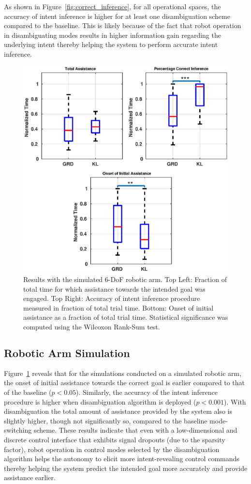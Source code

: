 \documentclass[conference]{IEEEtran}
\begin{document}
As shown in Figure~\ref{fig:correct_inference}, for all operational spaces, the accuracy of intent inference is higher for at least one disambiguation scheme compared to the baseline. This is likely because of the fact that robot operation in disambiguating modes results in higher information gain regarding the underlying intent thereby helping the system to perform accurate intent inference.
\begin{figure}[t]
	\centering
	\includegraphics[width= 1.\hsize, height=0.5\vsize]{./figures/mico_sim_res.eps}
	\vspace{-0.5cm}
	\caption{Results with the simulated 6-DoF robotic arm. Top Left: Fraction of total time for which assistance towards the intended goal was engaged. Top Right: Accuracy of intent inference procedure measured in fraction of total trial time. Bottom: Onset of initial assistance as a fraction of total trial time. Statistical significance was computed using the Wilcoxon Rank-Sum test. } 
	\label{fig:mico_results}
\end{figure}
\subsection{Robotic Arm Simulation}
Figure~\ref{fig:mico_results} reveals that for the simulations conducted on a simulated robotic arm, the onset of initial assistance towards the correct goal is earlier compared to that of the baseline ($p < 0.05$). Similarly, the accuracy of the intent inference procedure is higher when disambiguation algorithm is deployed ($p < 0.001$). With disambiguation the total amount of assistance provided by the system also is slightly higher, though not significantly so, compared to the baseline mode-switching scheme. These results indicate that even with a low-dimensional and discrete control interface that exhibits signal dropouts (due to the sparsity factor), robot operation in control modes selected by the disambiguation algorithm helps the autonomy to elicit more intent-revealing control commands thereby helping the system predict the intended goal more accurately and provide assistance earlier. 
\end{document}

